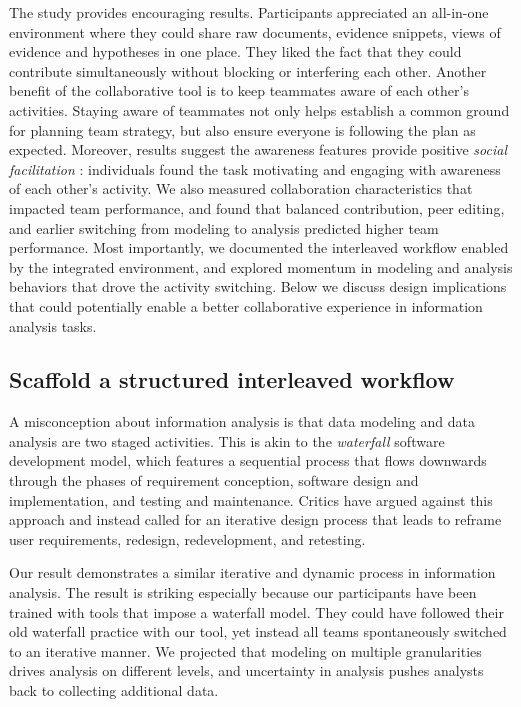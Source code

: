 The study provides encouraging results. Participants appreciated an all-in-one
environment where they could share raw documents, evidence snippets, views of
evidence and hypotheses in one place. They liked the fact that they could
contribute simultaneously without blocking or interfering each other. Another
benefit of the collaborative tool is to keep teammates aware of each other's
activities. Staying aware of teammates not only helps establish a common ground
for planning team strategy, but also ensure everyone is following the plan as
expected. Moreover, results suggest the awareness features provide positive
\emph{social facilitation} \cite{Zajonc1965}: individuals found the task
motivating and engaging with awareness of each other's activity. We also
measured collaboration characteristics that impacted team performance, and found
that balanced contribution, peer editing, and earlier switching from modeling to
analysis predicted higher team performance. Most importantly, we documented the
interleaved workflow enabled by the integrated environment, and explored
momentum in modeling and analysis behaviors that drove the activity switching.
Below we discuss design implications that could potentially enable a better
collaborative experience in information analysis tasks.

\subsection{Scaffold a structured interleaved workflow}

A misconception about information analysis is that data modeling and
data analysis are two staged activities. This is akin to the \emph{waterfall}
software development model, which features a sequential process that
flows downwards through the phases of requirement conception, software
design and implementation, and testing and maintenance. Critics have
argued against this approach and instead called for an iterative design
process that leads to reframe user requirements,
redesign, redevelopment, and retesting.

Our result demonstrates a similar iterative and dynamic process in information
analysis. The result is striking especially because our participants have been
trained with tools that impose a waterfall model. They could have followed their
old waterfall practice with our tool, yet instead all teams spontaneously
switched to an iterative manner. We projected that modeling on multiple granularities drives analysis on different levels, and uncertainty in analysis pushes analysts back to collecting additional data.

